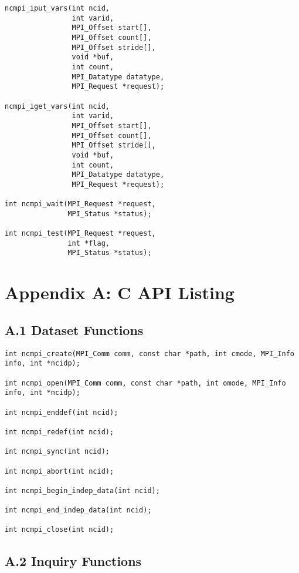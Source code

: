 \documentclass[10pt]{article}
\begin{document}
\begin{verbatim}
ncmpi_iput_vars(int ncid,
                int varid,
                MPI_Offset start[],
                MPI_Offset count[],
                MPI_Offset stride[],
                void *buf,
                int count,
                MPI_Datatype datatype,
                MPI_Request *request);

ncmpi_iget_vars(int ncid,
                int varid,
                MPI_Offset start[],
                MPI_Offset count[],
                MPI_Offset stride[],
                void *buf,
                int count,
                MPI_Datatype datatype,
                MPI_Request *request);

int ncmpi_wait(MPI_Request *request, 
               MPI_Status *status);

int ncmpi_test(MPI_Request *request,
               int *flag,
               MPI_Status *status);
\end{verbatim}

%
%



%
%
\section*{Appendix A: C API Listing}

%
%
\subsection*{A.1  Dataset Functions}

\begin{verbatim}
int ncmpi_create(MPI_Comm comm, const char *path, int cmode, MPI_Info info, int *ncidp);

int ncmpi_open(MPI_Comm comm, const char *path, int omode, MPI_Info info, int *ncidp);

int ncmpi_enddef(int ncid);

int ncmpi_redef(int ncid);

int ncmpi_sync(int ncid);

int ncmpi_abort(int ncid);

int ncmpi_begin_indep_data(int ncid);

int ncmpi_end_indep_data(int ncid);

int ncmpi_close(int ncid);
\end{verbatim}

%
%
\subsection*{A.2  Inquiry Functions}
\end{document}
